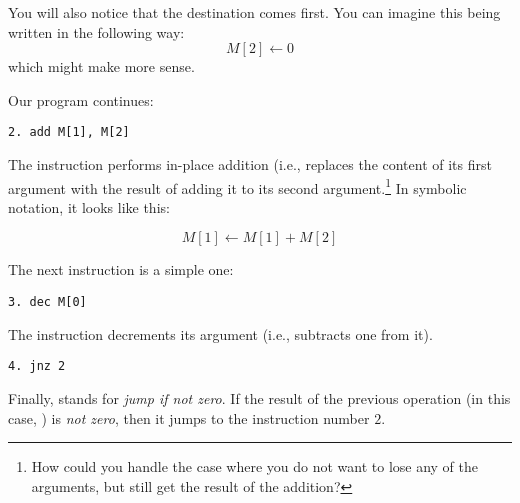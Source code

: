 You will also notice that the destination comes first. You can imagine this
being written in the following way:
%
\[
M[2] \leftarrow 0
\]
which might make more sense.

Our program continues:

\begin{verbatim}
2. add M[1], M[2]
\end{verbatim}

The  instruction performs in-place addition (i.e., replaces
the content of its first argument with the result of adding it to its second
argument.\footnote{How could you handle the case where you do not want to lose
any of the arguments, but still get the result of the addition?} In symbolic
notation, it looks like this:

\[
M[1] \leftarrow M[1] + M[2]
\]

The next instruction is a simple one:

\begin{verbatim}
3. dec M[0]
\end{verbatim}

The  instruction decrements its argument (i.e., subtracts one
from it).

\begin{verbatim}
4. jnz 2
\end{verbatim}

Finally,  stands for \emph{jump if not zero}. If the result of
the previous operation (in this case, ) is \emph{not zero},
then it jumps to the instruction number $2$.

